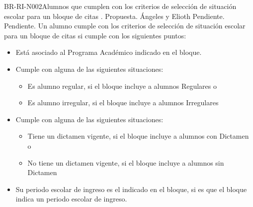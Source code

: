 	


\begin{BusinessRule}{BR-RI-N002}{Alumnos que cumplen con los criterios de selección de situación escolar para un bloque de citas}
	{\bcDerivation}    %
	{\btTimer}     %
	{\blControlling}    %
	.
	\BRItem[Estado] Propuesta.
	 Ángeles y Elioth
	 Pendiente.
	 Pendiente.
	\BRItem[Descripción] Un alumno cumple con los criterios de selección de situación escolar para un bloque de citas si cumple con los siguientes puntos:
	\begin{itemize}
		\item Está asociado al Programa Académico indicado en el bloque.
		\item Cumple con alguna de las siguientes situaciones:
		\begin{itemize}
			\item Es alumno regular, si el bloque incluye a alumnos Regulares o
			\item Es alumno irregular, si el bloque incluye a alumnos Irregulares
		\end{itemize}
	 	\item Cumple con alguna de las siguientes situaciones:
	 	\begin{itemize}
	 		\item Tiene un dictamen vigente, si el bloque incluye a alumnos con Dictamen o
	 		\item No tiene un dictamen vigente, si el bloque incluye a alumnos sin Dictamen
	 	\end{itemize}
 		\item Su periodo escolar de ingreso es el indicado en el bloque, si es que el bloque indica un periodo escolar de ingreso.

\end{itemize}
\end{BusinessRule}
